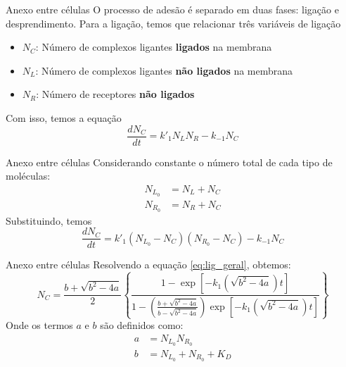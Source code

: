 \documentclass[aspectratio=169]{beamer}
\begin{document}
\begin{frame}{Anexo entre células}
    O processo de adesão é separado em duas fases: ligação e desprendimento. Para a ligação, temos
    que relacionar três variáveis de ligação
    \begin{itemize}
        \item $N_{C}$: Número de complexos ligantes \textbf{ligados} na membrana
        \item $N_{L}$: Número de complexos ligantes \textbf{não ligados} na membrana
        \item $N_{R}$: Número de receptores \textbf{não ligados}
    \end{itemize}
    Com isso, temos a equação
    \begin{equation}\label{eq:var_receptores}
        \frac{d N_C}{dt} = k'_{1} N_{L} N_{R} - k_{-1}N_{C}
    \end{equation}
\end{frame}

\begin{frame}{Anexo entre células}
    Considerando constante o número total de cada tipo de moléculas:
        \begin{align}\label{eq:lig_constante}
            N_{L_0} &= N_L + N_C \\
            N_{R_0} &= N_R + N_C 
        \end{align}
    Substituindo, temos
    \begin{equation}
        \frac{d N_C}{dt} = k'_{1} (N_{L_0} - N_C) (N_{R_0} - N_C) - k_{-1}N_{C} \label{eq:lig_geral}
    \end{equation}
\end{frame}

\begin{frame}{Anexo entre células}
    Resolvendo a equação \eqref{eq:lig_geral}, obtemos:
    \begin{equation}
        N_C = \frac{b+\sqrt{b^2-4a}}{2}\left\{\frac{1-\exp[-k_1 (\sqrt{b^2-4a})t]}{1-\left(\frac{b+\sqrt{b^2-4a}}{b-\sqrt{b^2-4a}}\right)\exp[-k_1 (\sqrt{b^2-4a})t]}\right\}
    \end{equation}
    Onde os termos $a$ e $b$ são definidos como:
        \begin{align*}
            a &= N_{L_0}N_{R_0} \\
            b &= N_{L_0} + N_{R_0} + K_D
        \end{align*}
\end{frame}
\end{document}
